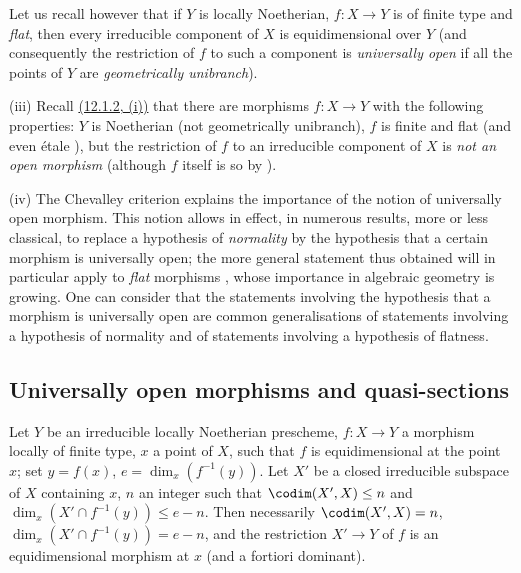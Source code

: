 \begin{remarks}[14.4.10]
Let us recall however  that if $Y$ is locally Noetherian, $f:X\to Y$ is of finite type and \emph{flat}, then every irreducible component of $X$ is equidimensional over $Y$ (and consequently the restriction of $f$ to such a component is \emph{universally open} if all the points of $Y$ are \emph{geometrically unibranch}).

(iii) Recall {\hyperlink{ega4.c04.item.12-1-2}{(12.1.2, (i))}} that there are morphisms $f:X\to Y$ with the following properties: $Y$ is Noetherian (not geometrically unibranch), $f$ is finite and flat (and even \'etale ), but the restriction of $f$ to an irreducible component of $X$ is \emph{not an open morphism} (although $f$ itself is so by ).

(iv) The Chevalley criterion  explains the importance of the notion of universally open morphism.
This notion allows in effect, in numerous results, more or less classical, to replace a hypothesis of \emph{normality} by the hypothesis that a certain morphism is universally open; the more general statement
thus obtained will in particular apply to \emph{flat} morphisms , whose importance in algebraic geometry is growing.
One can consider that the statements involving the hypothesis that a morphism is universally open are common generalisations of statements involving a hypothesis of normality and of statements involving a hypothesis of flatness.
\end{remarks}


\subsection{Universally open morphisms and quasi-sections}
\label{subsection:IV.14.5}
\label{IV.14.5}

\begin{lemma}[14.5.1]
\label{IV.14.5.1}
Let $Y$ be an irreducible locally Noetherian prescheme, $f:X\to Y$ a morphism locally of finite type, $x$ a point of $X$, such that $f$ is equidimensional  at the point $x$; set $y=f(x)$, $e=\dim_x(f^{-1}(y))$.
Let $X'$ be a closed irreducible subspace of $X$ containing $x$, $n$ an integer such that $\codim(X',X)\leq n$ and $\dim_x(X'\cap f^{-1}(y))\leq e-n$.
Then necessarily $\codim(X',X)=n$, $\dim_x(X'\cap f^{-1}(y))=e-n$, and the restriction $X'\to Y$ of $f$ is an equidimensional morphism at $x$ (and a fortiori dominant).
\end{lemma}

